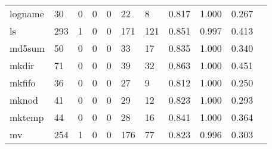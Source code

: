 \begin{longtable}{lp{1.10cm}p{1.10cm}p{1.10cm}p{1.10cm}p{1.10cm}p{1.10cm}p{1.10cm}p{1.10cm}p{1.10cm}p{1.10cm}}
logname   &                     30 &                                  0 &                                 0 &                                0 &                                22 &                               8 &                          0.817 &                                 1.000 &                               0.267 \\
ls        &                    293 &                                  1 &                                 0 &                                0 &                               171 &                             121 &                          0.851 &                                 0.997 &                               0.413 \\
md5sum    &                     50 &                                  0 &                                 0 &                                0 &                                33 &                              17 &                          0.835 &                                 1.000 &                               0.340 \\
mkdir     &                     71 &                                  0 &                                 0 &                                0 &                                39 &                              32 &                          0.863 &                                 1.000 &                               0.451 \\
mkfifo    &                     36 &                                  0 &                                 0 &                                0 &                                27 &                               9 &                          0.812 &                                 1.000 &                               0.250 \\
mknod     &                     41 &                                  0 &                                 0 &                                0 &                                29 &                              12 &                          0.823 &                                 1.000 &                               0.293 \\
mktemp    &                     44 &                                  0 &                                 0 &                                0 &                                28 &                              16 &                          0.841 &                                 1.000 &                               0.364 \\
mv        &                    254 &                                  1 &                                 0 &                                0 &                               176 &                              77 &                          0.823 &                                 0.996 &                               0.303 \\

\end{longtable}
